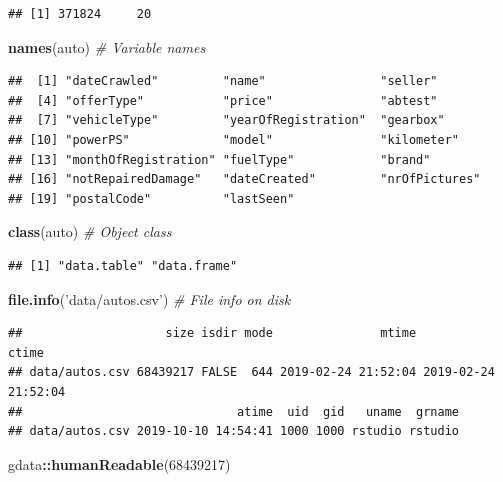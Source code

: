 \documentclass[]{book}
\newenvironment{Shaded}{\begin{snugshade}}{\end{snugshade}}
\newcommand{\CommentTok}[1]{\textcolor[rgb]{0.56,0.35,0.01}{\textit{#1}}}
\newcommand{\DecValTok}[1]{\textcolor[rgb]{0.00,0.00,0.81}{#1}}
\newcommand{\KeywordTok}[1]{\textcolor[rgb]{0.13,0.29,0.53}{\textbf{#1}}}
\newcommand{\NormalTok}[1]{#1}
\newcommand{\OperatorTok}[1]{\textcolor[rgb]{0.81,0.36,0.00}{\textbf{#1}}}
\newcommand{\StringTok}[1]{\textcolor[rgb]{0.31,0.60,0.02}{#1}}
\theoremstyle{definition}
\theoremstyle{definition}
\theoremstyle{definition}
\theoremstyle{remark}
\begin{document}
\begin{verbatim}
## [1] 371824     20
\end{verbatim}

\begin{Shaded}
\begin{Highlighting}[]
\KeywordTok{names}\NormalTok{(auto) }\CommentTok{# Variable names}
\end{Highlighting}
\end{Shaded}

\begin{verbatim}
##  [1] "dateCrawled"         "name"                "seller"             
##  [4] "offerType"           "price"               "abtest"             
##  [7] "vehicleType"         "yearOfRegistration"  "gearbox"            
## [10] "powerPS"             "model"               "kilometer"          
## [13] "monthOfRegistration" "fuelType"            "brand"              
## [16] "notRepairedDamage"   "dateCreated"         "nrOfPictures"       
## [19] "postalCode"          "lastSeen"
\end{verbatim}

\begin{Shaded}
\begin{Highlighting}[]
\KeywordTok{class}\NormalTok{(auto) }\CommentTok{# Object class}
\end{Highlighting}
\end{Shaded}

\begin{verbatim}
## [1] "data.table" "data.frame"
\end{verbatim}

\begin{Shaded}
\begin{Highlighting}[]
\KeywordTok{file.info}\NormalTok{(}\StringTok{'data/autos.csv'}\NormalTok{) }\CommentTok{# File info on disk}
\end{Highlighting}
\end{Shaded}

\begin{verbatim}
##                    size isdir mode               mtime               ctime
## data/autos.csv 68439217 FALSE  644 2019-02-24 21:52:04 2019-02-24 21:52:04
##                              atime  uid  gid   uname  grname
## data/autos.csv 2019-10-10 14:54:41 1000 1000 rstudio rstudio
\end{verbatim}

\begin{Shaded}
\begin{Highlighting}[]
\NormalTok{gdata}\OperatorTok{::}\KeywordTok{humanReadable}\NormalTok{(}\DecValTok{68439217}\NormalTok{)}
\end{Highlighting}
\end{Shaded}
\end{document}
